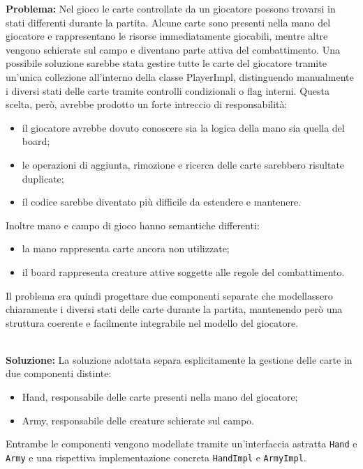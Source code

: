 \textbf{Problema:} Nel gioco le carte controllate da un giocatore possono trovarsi in stati
differenti durante la partita. Alcune carte sono presenti nella mano del giocatore e rappresentano
le risorse immediatamente giocabili, mentre altre vengono schierate sul campo e diventano parte attiva
del combattimento. Una possibile soluzione sarebbe stata gestire tutte le carte del giocatore tramite
un'unica collezione all'interno della classe PlayerImpl, distinguendo manualmente i diversi stati
delle carte tramite controlli condizionali o flag interni. Questa scelta, però, avrebbe prodotto
un forte intreccio di responsabilità:
\begin{itemize}
\item il giocatore avrebbe dovuto conoscere sia la logica della mano sia quella del board;
\item le operazioni di aggiunta, rimozione e ricerca delle carte sarebbero risultate duplicate;
\item il codice sarebbe diventato più difficile da estendere e mantenere.
\end{itemize}

Inoltre mano e campo di gioco hanno semantiche differenti:
\begin{itemize}
\item la mano rappresenta carte ancora non utilizzate;
\item il board rappresenta creature attive soggette alle regole del combattimento.
\end{itemize}

Il problema era quindi progettare due componenti separate che modellassero chiaramente i diversi
stati delle carte durante la partita, mantenendo però una struttura coerente e facilmente
integrabile nel modello del giocatore.

\textbf{\\Soluzione:} La soluzione adottata separa esplicitamente la gestione delle
carte in due componenti distinte:
\begin{itemize}
\item Hand, responsabile delle carte presenti nella mano del giocatore;
\item Army, responsabile delle creature schierate sul campo.
\end{itemize}

Entrambe le componenti vengono modellate tramite un'interfaccia astratta
\texttt{Hand} e \texttt{Army}
e una rispettiva implementazione concreta \texttt{HandImpl}
e \texttt{ArmyImpl}.

